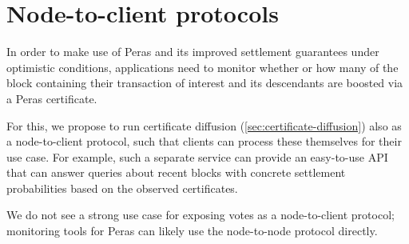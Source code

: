 \section{Node-to-client protocols}

In order to make use of Peras and its improved settlement guarantees under optimistic conditions, applications need to monitor whether or how many of the block containing their transaction of interest and its descendants are boosted via a Peras certificate.

For this, we propose to run certificate diffusion (\cref{sec:certificate-diffusion}) also as a node-to-client protocol, such that clients can process these themselves for their use case.
For example, such a separate service can provide an easy-to-use API that can answer queries about recent blocks with concrete settlement probabilities based on the observed certificates.

We do not see a strong use case for exposing votes as a node-to-client protocol; monitoring tools for Peras can likely use the node-to-node protocol directly.

